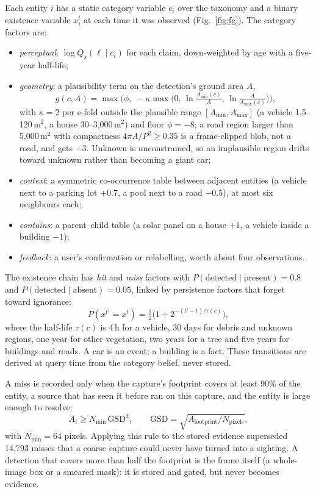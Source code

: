 \documentclass[journal]{IEEEtran}
\begin{document}
Each entity $i$ has a static category variable $c_i$ over the taxonomy and a binary existence
variable $x_i^t$ at each time it was observed (Fig.~\ref{fig:fg}). The category factors are:
\begin{itemize}
\item \emph{perceptual}: $\log Q_s(\ell \mid c_i)$ for each claim, down-weighted by age with a
five-year half-life;
\item \emph{geometry}: a plausibility term on the detection's ground area $A$,
\begin{equation}
g(c, A) = \max\!\Big(\phi,\; -\kappa \max\big(0,\, \ln\tfrac{A_{\min}(c)}{A},\, \ln\tfrac{A}{A_{\max}(c)}\big)\Big),
\label{eq:geom}
\end{equation}
with $\kappa = 2$ per e-fold outside the plausible range $[A_{\min}, A_{\max}]$ (a vehicle
1.5--120\,m$^2$, a house 30--3{,}000\,m$^2$) and floor $\phi=-8$; a road region larger than
5{,}000\,m$^2$ with compactness $4\pi A/P^2 \ge 0.35$ is a frame-clipped blob, not a road, and gets
$-3$. Unknown is unconstrained, so an implausible region drifts toward unknown rather than
becoming a giant car;
\item \emph{context}: a symmetric co-occurrence table between adjacent entities (a vehicle next to a
parking lot $+0.7$, a pool next to a road $-0.5$), at most six neighbours each;
\item \emph{contains}: a parent--child table (a solar panel on a house $+1$, a vehicle inside a
building $-1$);
\item \emph{feedback}: a user's confirmation or relabelling, worth about four observations.
\end{itemize}

The existence chain has \emph{hit} and \emph{miss} factors with $P(\text{detected}\mid
\text{present}) = 0.8$ and $P(\text{detected}\mid\text{absent}) = 0.05$, linked by persistence
factors that forget toward ignorance:
\begin{equation}
P(x^{t'} = x^{t}) = \tfrac12 \big(1 + 2^{-(t'-t)/\tau(c)}\big),
\label{eq:persist}
\end{equation}
where the half-life $\tau(c)$ is 4\,h for a vehicle, 30 days for debris and unknown regions, one year
for other vegetation, two years for a tree and five years for buildings and roads. A car is an
event; a building is a fact. These transitions are derived at query time from the category
belief, never stored.

A miss is recorded only when the capture's footprint covers at least 90\% of the entity, a source
that has seen it before ran on this capture, and the entity is large enough to resolve:
\begin{equation}
A_i \ge N_{\min}\, \mathrm{GSD}^2, \qquad \mathrm{GSD} = \sqrt{A_{\text{footprint}} / N_{\text{pixels}}},
\label{eq:miss}
\end{equation}
with $N_{\min} = 64$ pixels. Applying this rule to the stored evidence superseded 14{,}793 misses
that a coarse capture could never have turned into a sighting. A detection that covers more than
half the footprint is the frame itself (a whole-image box or a smeared mask): it is stored and
gated, but never becomes evidence.
\end{document}
